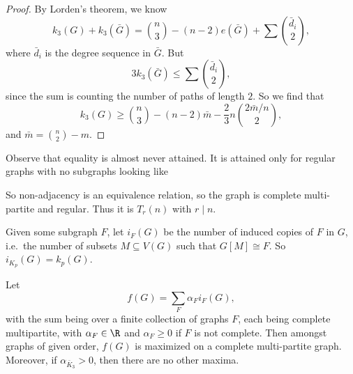 \documentclass[a4paper]{article}
\begin{document}
\begin{proof}
  By Lorden's theorem, we know
  \[
    k_3(G) + k_3(\bar{G}) = \binom{n}{3} - (n - 2) e(\bar{G}) + \sum\binom{\bar{d}_i}{2},
  \]
  where $\bar{d}_i$ is the degree sequence in $\bar{G}$. But
  \[
    3 k_3(\bar{G}) \leq \sum \binom{\bar{d}_i}{2},
  \]
  since the sum is counting the number of paths of length $2$. So we find that
  \[
    k_3(G) \geq \binom{n}{3} - (n - 2)\bar{m} - \frac{2}{3}n \binom{2 \bar{m}/n}{2},
  \]
  and $\bar{m} = \binom{n}{2} - m$.
\end{proof}
Observe that equality is almost never attained. It is attained only for regular graphs with no subgraphs looking like
\begin{center}
\end{center}
So non-adjacency is an equivalence relation, so the graph is complete multi-partite and regular. Thus it is $T_r(n)$ with $r \mid n$.

Given some subgraph $F$, let $i_F(G)$ be the number of induced copies of $F$ in $G$, i.e.\ the number of subsets $M \subseteq V(G)$ such that $G[M] \cong F$. So $i_{K_p}(G) = k_p(G)$.

\begin{thm}
  Let
  \[
    f(G) = \sum_F \alpha_F i_F(G),
  \]
  with the sum being over a finite collection of graphs $F$, each being complete multipartite, with $\alpha_F \in \R$ and $\alpha_F \geq 0$ if $F$ is not complete. Then amongst graphs of given order, $f(G)$ is maximized on a complete multi-partite graph. Moreover, if $\alpha_{\bar{K}_3} > 0$, then there are no other maxima.
\end{thm}
\end{document}
